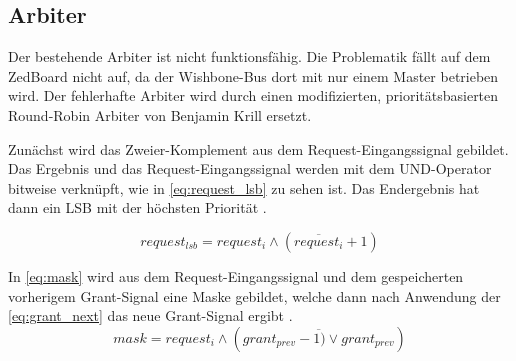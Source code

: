 
\subsection{Arbiter}

Der bestehende Arbiter ist nicht funktionsfähig. Die Problematik fällt auf dem ZedBoard nicht auf, da der Wishbone-Bus dort mit nur einem Master betrieben wird. Der fehlerhafte Arbiter wird durch einen modifizierten, prioritätsbasierten Round-Robin Arbiter von Benjamin Krill \cite{website:vhdl_round_robin_arbiter} ersetzt.

 Zunächst wird das Zweier-Komplement aus dem Request-Eingangssignal gebildet. Das Ergebnis und das Request-Eingangssignal werden mit dem UND-Operator bitweise verknüpft, wie in \cref{eq:request_lsb} zu sehen ist.  Das Endergebnis hat dann ein \gls{LSB} mit der höchsten Priorität \cite{website:vhdl_round_robin_arbiter}. 

\begin{equation} \label{eq:request_lsb}
	request_{lsb} = request_i \land (\overline{request_i} + 1)	
\end{equation}

In \cref{eq:mask} wird aus dem Request-Eingangssignal und dem gespeicherten vorherigem Grant-Signal eine Maske gebildet, welche dann nach Anwendung der \cref{eq:grant_next} das neue Grant-Signal ergibt \cite{website:vhdl_round_robin_arbiter}.  
\begin{equation} \label{eq:mask}
	mask = request_i \land (\overline{grant_{prev} - 1)  \lor grant_{prev}})
\end{equation}

